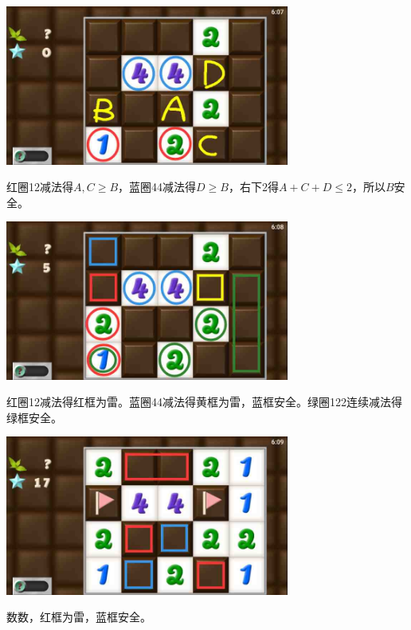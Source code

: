 \subsection{} %
\begin{center}
    \includegraphics[width=0.7\textwidth]{puzzlelow/192-1.jpg}
\end{center}
红圈12减法得$A,C\ge B$，蓝圈44减法得$D\ge B$，右下2得$A+C+D\le 2$，所以$B$安全。
\begin{center}
    \includegraphics[width=0.7\textwidth]{puzzlelow/192-2.jpg}
\end{center}
红圈12减法得红框为雷。蓝圈44减法得黄框为雷，蓝框安全。绿圈122连续减法得绿框安全。
\begin{center}
    \includegraphics[width=0.7\textwidth]{puzzlelow/192-3.jpg}
\end{center}
数数，红框为雷，蓝框安全。

